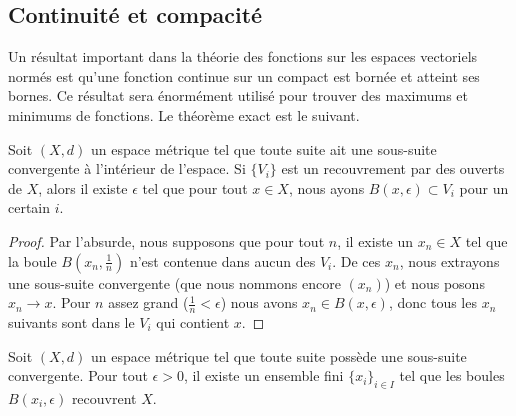 \subsection{Continuité et compacité}

Un résultat important dans la théorie des fonctions sur les espaces vectoriels normés est qu'une fonction continue sur un compact est bornée et atteint ses bornes. Ce résultat sera énormément utilisé pour trouver des maximums et minimums de fonctions. Le théorème exact est le suivant.

\begin{lemma}    \label{LemQFXOWyx}
	Soit \( (X,d)\) un espace métrique tel que toute suite ait une sous-suite convergente à l'intérieur de l'espace. Si \( \{ V_i \}\) est un recouvrement par des ouverts de \( X\), alors il existe \( \epsilon\) tel que pour tout \( x\in X\), nous ayons \( B(x,\epsilon)\subset V_i\) pour un certain \( i\).
\end{lemma}

\begin{proof}
	Par l'absurde, nous supposons que pour tout \( n\), il existe un \( x_n\in X\) tel que la boule \( B(x_n,\frac{1}{ n })\) n'est contenue dans aucun des \( V_i\). De ces \( x_n\), nous extrayons une sous-suite convergente (que nous nommons encore \( (x_n)\)) et nous posons \( x_n\to x\). Pour \( n\) assez grand (\( \frac{1}{ n }<\epsilon\)) nous avons \( x_n\in B(x,\epsilon)\), donc tous les \( x_n\) suivants sont dans le \( V_i\) qui contient \( x\).
\end{proof}

\begin{lemma}   \label{LemMGQqgDG}
	Soit \( (X,d)\) un espace métrique tel que toute suite possède une sous-suite convergente. Pour tout \( \epsilon>0\), il existe un ensemble fini \( \{ x_i \}_{i\in I}\) tel que les boules \( B(x_i,\epsilon)\) recouvrent \( X\).
\end{lemma}

